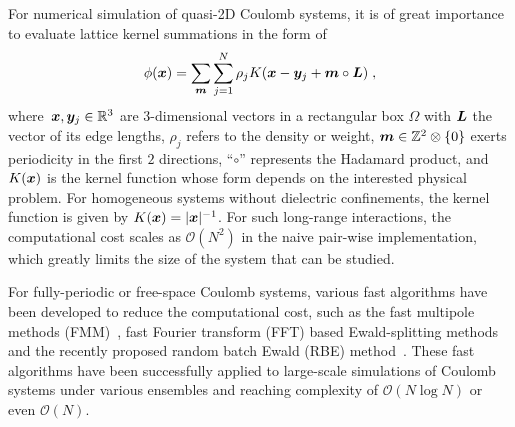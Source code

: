 
For numerical simulation of quasi-2D Coulomb systems, it is of great importance to evaluate lattice kernel summations in the form of
\begin{equation}\label{eq::phi12}
	\phi(\boldsymbol{x}) = \sum_{\boldsymbol{m}} \sum_{j = 1}^{N} \rho_j K(\boldsymbol{x} - \boldsymbol{y}_j + \boldsymbol{m} \circ \boldsymbol{L})\;,
\end{equation}
where~$\boldsymbol{x}, \boldsymbol{y}_j \in \mathbb{R}^3$ are $3$-dimensional vectors in a rectangular box $\Omega$ with $\boldsymbol{L}$ the vector of its edge lengths, $\rho_j$ refers to the density or weight, $\boldsymbol{m} \in \mathbb{Z}^2 \otimes \{0\}$ exerts periodicity in the first $2$ directions, ``$\circ$'' represents the Hadamard product, and~$K(\boldsymbol{x})$ is the kernel function whose form depends on the interested physical problem. 
For homogeneous systems without dielectric confinements, the kernel function is given by $K(\boldsymbol{x}) = \lvert\boldsymbol{x}\rvert^{-1}$.
For such long-range interactions, the computational cost scales as $\mathcal O(N^2)$ in the naive pair-wise implementation, which greatly limits the size of the system that can be studied.


For fully-periodic or free-space Coulomb systems, various fast algorithms have been developed to reduce the computational cost, such as the fast multipole methods (FMM)~\cite{greengard1987fast,cheng1999fast,ying2004kernel}, fast Fourier transform (FFT) based Ewald-splitting methods~\cite{hockney2021computer,darden1993particle,essmann1995smooth} and the recently proposed random batch Ewald (RBE) method~\cite{jin2021random, liang2022superscalability,liang2024JCP}.
These fast algorithms have been successfully applied to large-scale simulations of Coulomb systems under various ensembles and reaching complexity of $\mathcal O(N\log N)$ or even $\mathcal O(N)$.
 
